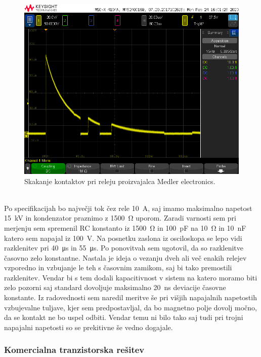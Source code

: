 \documentclass[a4paper,twoside,openright,12pt,slovene]{book}
\begin{document}
    \begin{figure}[H]
        \centering
        \includegraphics[width=1\columnwidth]{Slike/MedlerElectronicsRele.png}
        \caption{\label{BlokDiagramShema} Skakanje kontaktov pri releju proizvajalca Medler electronics.}
    \end{figure}
    
    ~\\Po specifikacijah bo največji tok čez rele \SI{10}{\ampere}, saj imamo maksimalno napetost \SI{15}{\kilo\volt} in kondenzator praznimo z \SI{1500}{\ohm} uporom. Zaradi varnosti sem pri merjenju sem spremenil RC konstanto iz \SI{1500}{\ohm} in \SI{100}{\pico\farad} na \SI{10}{\ohm} in \SI{10}{\nano\farad} katero sem napajal iz \SI{100}{\volt}. Na posnetku zaslona iz osciloskopa se lepo vidi razklenitev pri \SI{40}{\micro\second} in \SI{55}{\micro\second}. Po ponovitvah sem ugotovil, da so razklenitve časovno zelo konstantne. Nastala je ideja o vezanju dveh ali več enakih relejev vzporedno in vzbujanje le teh s časovnim zamikom, saj bi tako premostili razklenitev. Vendar bi s tem dodali kapacitivnost v sistem na katero moramo biti zelo pozorni saj standard dovoljuje maksimalno \SI{20}{\nano\second} deviacije časovne konstante.
    Iz radovednosti sem naredil meritve še pri višjih napajalnih napetostih vzbujevalne tuljave, kjer sem predpostavljal, da bo magnetno polje dovolj močno, da se kontakt ne bo uspel odbiti. Vendar temu ni bilo tako saj tudi pri trojni napajalni napetosti so se prekitivne še vedno dogajale. 
   
	\subsubsection{Komercialna tranzistorska rešitev} \label{Komercialna tranzistorska rešitev}   
    
\end{document}
